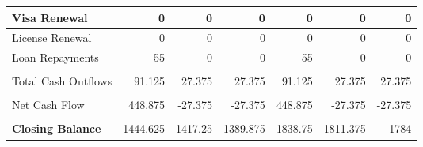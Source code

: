 \begin{table}[htbp]
\begin{tabular}{|l|r|r|r|r|r|r|}
    \midrule
    Visa Renewal & 0     & 0     & 0     & 0     & 0     & 0 \\
    \midrule
    License Renewal & 0     & 0     & 0     & 0     & 0     & 0 \\
    \midrule
    Loan Repayments & 55    & 0     & 0     & 55    & 0     & 0 \\
    \midrule
          &       &       &       &       &       &  \\
    \midrule
    Total Cash Outflows & 91.125 & 27.375 & 27.375 & 91.125 & 27.375 & 27.375 \\
    \midrule
          &       &       &       &       &       &  \\
    \midrule
    Net Cash Flow & 448.875 & -27.375 & -27.375 & 448.875 & -27.375 & -27.375 \\
    \midrule
          &       &       &       &       &       &  \\
    \midrule
    \textbf{Closing Balance} & 1444.625 & 1417.25 & 1389.875 & 1838.75 & 1811.375 & 1784 \\
    \bottomrule
    \hline
    \hline
    \end{tabular}%
  \label{tab:addlabel}%
\end{table}%


